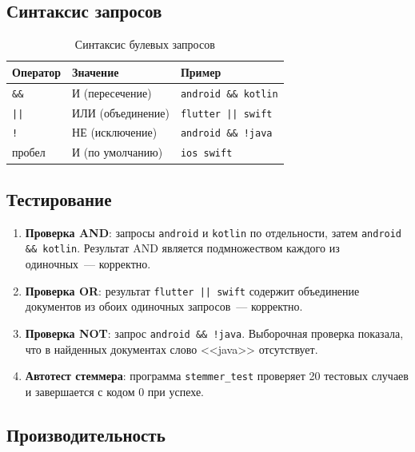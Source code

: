 \documentclass[12pt,a4paper]{article}
\begin{document}
\subsection{Синтаксис запросов}

\begin{table}[h]
\centering
\begin{tabular}{@{}lll@{}}
\toprule
\textbf{Оператор} & \textbf{Значение} & \textbf{Пример} \\ \midrule
\texttt{\&\&} & И (пересечение) & \texttt{android \&\& kotlin} \\
\texttt{||} & ИЛИ (объединение) & \texttt{flutter || swift} \\
\texttt{!} & НЕ (исключение) & \texttt{android \&\& !java} \\
пробел & И (по умолчанию) & \texttt{ios swift} \\ \bottomrule
\end{tabular}
\caption{Синтаксис булевых запросов}
\end{table}

\subsection{Тестирование}

\begin{enumerate}
    \item \textbf{Проверка AND}: запросы \texttt{android} и \texttt{kotlin} по отдельности, затем \texttt{android \&\& kotlin}. Результат AND является подмножеством каждого из одиночных~--- корректно.

    \item \textbf{Проверка OR}: результат \texttt{flutter || swift} содержит объединение документов из обоих одиночных запросов~--- корректно.

    \item \textbf{Проверка NOT}: запрос \texttt{android \&\& !java}. Выборочная проверка показала, что в найденных документах слово <<java>> отсутствует.

    \item \textbf{Автотест стеммера}: программа \texttt{stemmer\_test} проверяет 20 тестовых случаев и завершается с кодом 0 при успехе.
\end{enumerate}

\subsection{Производительность}
\end{document}
